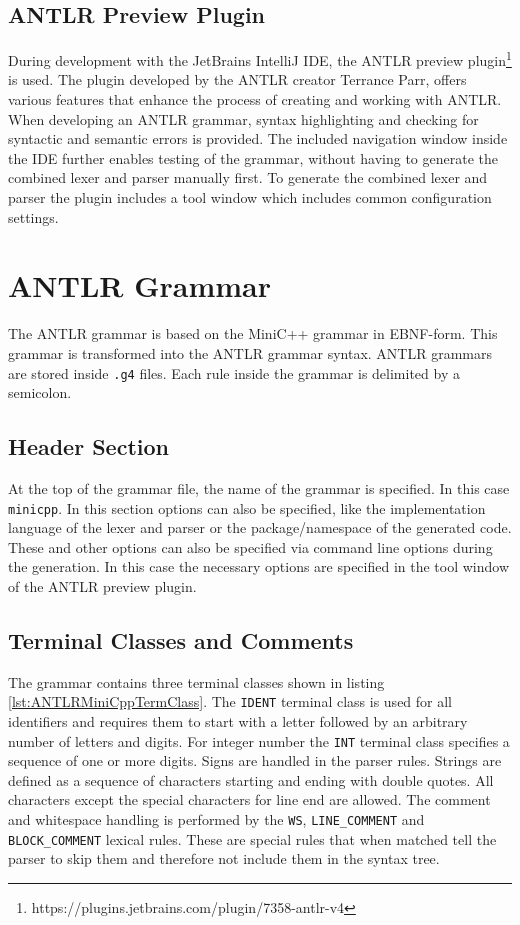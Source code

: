\subsection{ANTLR Preview Plugin}

During development with the JetBrains IntelliJ IDE, the ANTLR preview plugin\footnote{https://plugins.jetbrains.com/plugin/7358-antlr-v4} is used. The plugin developed by the ANTLR creator Terrance Parr, offers various features that enhance the process of creating and working with ANTLR. When developing an ANTLR grammar, syntax highlighting and checking for syntactic and semantic errors is provided. The included navigation window inside the IDE further enables testing of the grammar, without having to generate the combined lexer and parser manually first. To generate the combined lexer and parser the plugin includes a tool window which includes common configuration settings.

\section{ANTLR Grammar}

The ANTLR grammar is based on the MiniC++ grammar in EBNF-form. This grammar is transformed into the ANTLR grammar syntax. ANTLR grammars are stored inside \texttt{.g4} files. Each rule inside the grammar is delimited by a semicolon. 

\subsection{Header Section}

At the top of the grammar file, the name of the grammar is specified. In this case \texttt{minicpp}. In this section options can also be specified, like the implementation language of the lexer and parser or the package/namespace of the generated code. These and other options can also be specified via command line options during the generation. In this case the necessary options are specified in the tool window of the ANTLR preview plugin. 


\subsection{Terminal Classes and Comments}

The grammar contains three terminal classes shown in listing \ref{lst:ANTLRMiniCppTermClass}. The \texttt{IDENT} terminal class is used for all identifiers and requires them to start with a letter followed by an arbitrary number of letters and digits. For integer number the \texttt{INT} terminal class specifies a sequence of one or more digits. Signs are handled in the parser rules. Strings are defined as a sequence of characters starting and ending with double quotes. All characters except the special characters for line end are allowed. The comment and whitespace handling is performed by the \texttt{WS}, \verb|LINE_COMMENT| and \verb|BLOCK_COMMENT| lexical rules. These are special rules that when matched tell the parser to skip them and therefore not include them in the syntax tree. 

